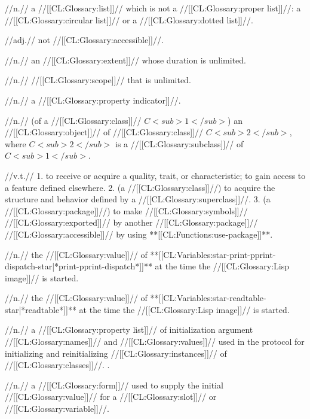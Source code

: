  //n.// a //[[CL:Glossary:list]]// which is not a //[[CL:Glossary:proper list]]//: a //[[CL:Glossary:circular list]]// or a //[[CL:Glossary:dotted list]]//.
 
 //adj.// not //[[CL:Glossary:accessible]]//.
 
 //n.// an //[[CL:Glossary:extent]]// whose duration is unlimited. 
 
 //n.// //[[CL:Glossary:scope]]// that is unlimited.
 
 //n.// a //[[CL:Glossary:property indicator]]//.

 //n.// (of a //[[CL:Glossary:class]]// $C<sub>1</sub>$) an //[[CL:Glossary:object]]// of //[[CL:Glossary:class]]// $C<sub>2</sub>$, where $C<sub>2</sub>$ is a //[[CL:Glossary:subclass]]// of $C<sub>1</sub>$. 

 //v.t.// 1. to receive or acquire a quality, trait, or characteristic; to gain access to a feature defined elsewhere. 2. (a //[[CL:Glossary:class]]//) to acquire the structure and behavior defined by a //[[CL:Glossary:superclass]]//. 3. (a //[[CL:Glossary:package]]//) to make //[[CL:Glossary:symbols]]// //[[CL:Glossary:exported]]// by another //[[CL:Glossary:package]]// //[[CL:Glossary:accessible]]// by using **[[CL:Functions:use-package]]**.
 
 //n.// the //[[CL:Glossary:value]]// of **[[CL:Variables:star-print-pprint-dispatch-star|*print-pprint-dispatch*]]** at the time the //[[CL:Glossary:Lisp image]]// is started.

 //n.// the //[[CL:Glossary:value]]// of **[[CL:Variables:star-readtable-star|*readtable*]]** at the time the //[[CL:Glossary:Lisp image]]// is started.

 //n.// a //[[CL:Glossary:property list]]// of initialization argument //[[CL:Glossary:names]]// and //[[CL:Glossary:values]]// used in the protocol for initializing and reinitializing //[[CL:Glossary:instances]]// of //[[CL:Glossary:classes]]//. \Seesection\ObjectCreationAndInit.
 
 //n.// a //[[CL:Glossary:form]]// used to supply the initial //[[CL:Glossary:value]]// for a //[[CL:Glossary:slot]]// or //[[CL:Glossary:variable]]//. 

